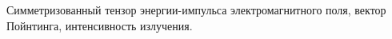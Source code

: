 \documentclass[__main__.tex]{subfiles}
\begin{document}
Симметризованный тензор энергии-импульса электромагнитного поля, вектор Пойнтинга, интенсивность излучения.\\ 

\end{document}
